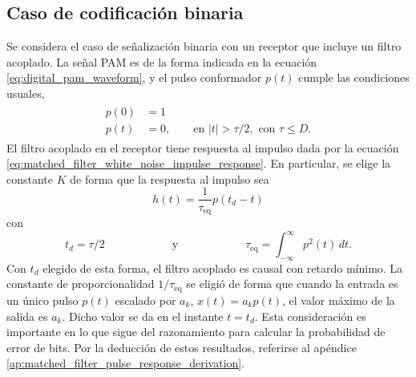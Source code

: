 \documentclass[a4paper]{article}
\begin{document}
\subsection{Caso de codificación binaria}\label{sec:error_probability_binary}

Se considera el caso de señalización binaria con un receptor que incluye un filtro acoplado. La señal PAM es de la forma indicada en la ecuación \ref{eq:digital_pam_waveform}, y el pulso conformador \(p(t)\) cumple las condiciones usuales,
\begin{align}
 \begin{split}
 p(0) &= 1  \label{eq:shaped_pulse_centered}\\
 p(t) &= 0, \qquad \textrm{en } |t|>\tau/2,\textrm{ con }\tau\leq D.
 \end{split}
\end{align}
El filtro acoplado en el receptor tiene respuesta al impulso dada por la ecuación  \ref{eq:matched_filter_white_noise_impulse_response}. En particular, se elige la constante \(K\) de forma que la respuesta al impulso sea
\begin{equation}\label{eq:matched_filter_impulse_response}
 h(t)=\frac{1}{\tau_\textrm{eq}}p(t_d-t)
\end{equation}
con
\begin{equation}\label{eq:tau_eq}
  t_d=\tau/2\qquad\qquad\qquad\textrm{y}\qquad\qquad\qquad \tau_\textrm{eq}=\int_{-\infty}^{\infty}p^2(t)\,dt.
\end{equation}
Con \(t_d\) elegido de esta forma, el filtro acoplado es causal con retardo mínimo. La constante de proporcionalidad \(1/\tau_\textrm{eq}\) se eligió de forma que cuando la entrada es un único pulso \(p(t)\) escalado por \(a_k\), \(x(t)=a_kp(t)\), el valor máximo de la salida es \(a_k\). Dicho valor se da en el instante \(t=t_d\). Esta consideración es importante en lo que sigue del razonamiento para calcular la probabilidad de error de bits. Por la deducción de estos resultados, referirse al apéndice \ref{ap:matched_filter_pulse_response_derivation}.
\end{document}
